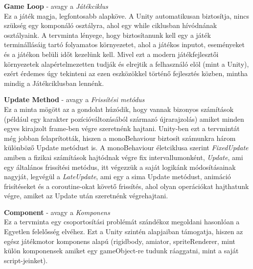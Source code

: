 \textbf{Game Loop} - avagy a \textit{Játékciklus}\\
Ez a játék magja, legfontosabb alapköve. A Unity automatikusan biztosítja, nincs szükség egy komponáló osztályra, ahol egy while ciklusban hívódnának osztályaink. A tervminta lényege, hogy biztosítanunk kell egy a játék terminállásáig tartó folyamatos környezetet, ahol a játékos inputot, eseményeket és a játékon belüli időt kezelünk kell. Mivel ezt a modern játékfejlesztői környezetek alapértelmezetten tudják és elrejtik a felhasználó elöl (mint a Unity), ezért érdemes úgy tekinteni az ezen eszközökkel történő fejlesztés közben, mintha mindig a Játékciklusban lennénk.

\textbf{Update Method} - avagy a \textit{Frissítési metódus}\\
Ez a minta mögött az a gondolat húzódik, hogy vannak bizonyos számítások (például egy karakter pozícióváltozásából származó újrarajzolás) amiket minden egyes kirajzolt frame-ben végre szeretnénk hajtani. Unity-ben ezt a tervmintát még jobban felaprították, hiszen a monoBehaviour biztosít számunkra három különböző Update metódust is. A monoBehaviour életciklusa szerint \textit{FixedUpdate} amiben a fizikai számítások hajtódnak végre fix intervallumonként, \textit{Update}, ami egy általános frissítési metódus, itt végezzük a saját logikánk módosításainak nagyját, legvégül a \textit{LateUpdate}, ami egy a sima Update metódust, animáció frisítéseket és a coroutine-okat követő frissítés, ahol olyan operációkat hajthatunk végre, amiket az Update után szeretnénk végrehajtani.

\textbf{Component} - avagy a \textit{Komponens}\\
Ez a tervminta egy csoportosítási problémát szándékoz megoldani hasonlóan a Egyetlen felelősség elvéhez. Ezt a Unity szintén alapjaiban támogatja, hiszen az egész játékmotor komponens alapú (rigidbody, amiator, spriteRenderer, mint külön komponensek amiket egy gameObject-re tudunk ráaggatni, mint a saját script-jeinket).

